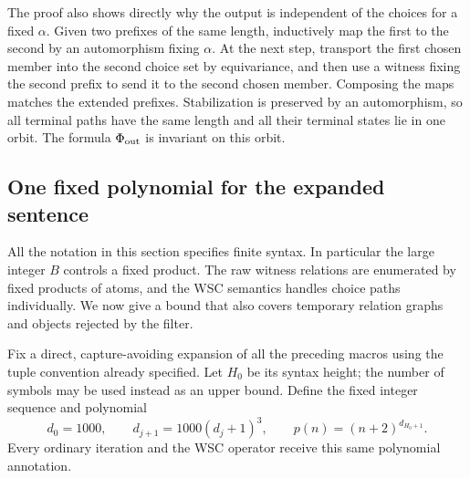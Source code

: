 The proof also shows directly why the output is independent of the
choices for a fixed \(\alpha\). Given two prefixes of the same length,
inductively map the first to the second by an automorphism fixing
\(\alpha\). At the next step, transport the first chosen member into the
second choice set by equivariance, and then use a witness fixing the
second prefix to send it to the second chosen member. Composing the
maps matches the extended prefixes. Stabilization is preserved by an
automorphism, so all terminal paths have the same length and all their
terminal states lie in one orbit. The formula \(\Phi_{\rm out}\) is
invariant on this orbit.

\subsection{One fixed polynomial for the expanded sentence}

All the notation in this section specifies finite syntax. In particular
the large integer \(B\) controls a fixed product. The raw witness
relations are enumerated by fixed products of atoms, and the WSC
semantics handles choice paths individually. We now give a bound that
also covers temporary relation graphs and objects rejected by the filter.

Fix a direct, capture-avoiding expansion of all the preceding macros
using the tuple convention already specified. Let \(H_0\) be its
syntax height; the number of symbols may be used instead as an upper
bound. Define the fixed integer sequence and polynomial
\begin{equation}
 d_0=1000,\qquad d_{j+1}=1000(d_j+1)^3,\qquad
 p(n)=(n+2)^{d_{H_0+1}}.
 \label{sen:polynomial}
\end{equation}
Every ordinary iteration and the WSC operator receive this same
polynomial annotation.

